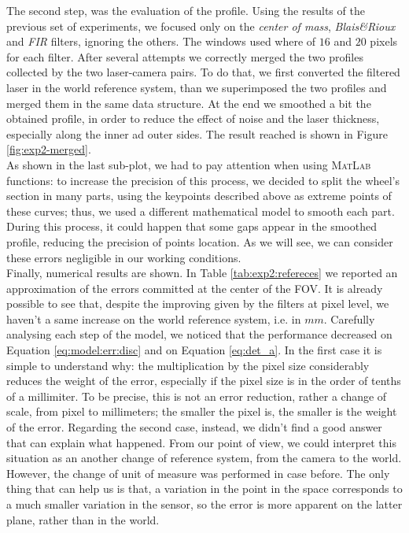 The second step, was the evaluation of the profile. Using the results of the previous set of experiments, we focused only on the \textit{center of mass}, \textit{Blais\&Rioux} and \textit{FIR} filters, ignoring the others. The windows used where of $16$ and $20$ pixels for each filter. After several attempts we correctly merged the two profiles collected by the two laser-camera pairs. To do that, we first converted the filtered laser in the world reference system, than we superimposed the two profiles and merged them in the same data structure. At the end we smoothed a bit the obtained profile, in order to reduce the effect of noise and the laser thickness, especially along the inner ad outer sides. The result reached is shown in Figure \ref{fig:exp2-merged}. \\

As shown in the last sub-plot, we had to pay attention when using \textsc{MatLab} functions: to increase the precision of this process, we decided to split the wheel's section in many parts, using the keypoints described above as extreme points of these curves; thus, we used a different mathematical model to smooth each part. During this process, it could happen that some gaps appear in the smoothed profile, reducing the precision of points location. As we will see, we can consider these errors negligible in our working conditions. \\

Finally, numerical results are shown. In Table \ref{tab:exp2:refereces} we reported an approximation of the errors committed at the center of the \acs{FOV}. It is already possible to see that, despite the improving given by the filters at pixel level, we haven't a same increase on the world reference system, i.e. in $mm$. Carefully analysing each step of the model, we noticed that the performance decreased on Equation \ref{eq:model:err:disc} and on Equation \ref{eq:det_a}. In the first case it is simple to understand why: the multiplication by the pixel size considerably reduces the weight of the error, especially if the pixel size is in the order of tenths of a millimiter. To be precise, this is not an error reduction, rather a change of scale, from pixel to millimeters; the smaller the pixel is, the smaller is the weight of the error. Regarding the second case, instead, we didn't find a good answer that can explain what happened. From our point of view, we could interpret this situation as an another change of reference system, from the camera to the world. However, the change of unit of measure was performed in case before. The only thing that can help us is that, a variation in the point in the space corresponds to a much smaller variation in the sensor, so the error is more apparent on the latter plane, rather than in the world.
  

